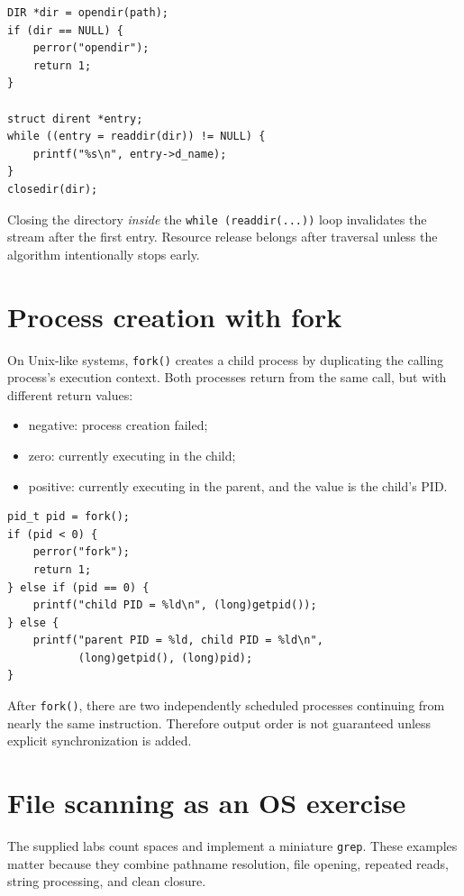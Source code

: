 \begin{lstlisting}[style=osc]
DIR *dir = opendir(path);
if (dir == NULL) {
    perror("opendir");
    return 1;
}

struct dirent *entry;
while ((entry = readdir(dir)) != NULL) {
    printf("%s\n", entry->d_name);
}
closedir(dir);
\end{lstlisting}

\begin{pitfall}
Closing the directory \emph{inside} the \texttt{while (readdir(...))} loop invalidates the stream after the first entry. Resource release belongs after traversal unless the algorithm intentionally stops early.
\end{pitfall}

\section{Process creation with fork}
On Unix-like systems, \texttt{fork()} creates a child process by duplicating the calling process's execution context. Both processes return from the same call, but with different return values:
\begin{itemize}
  \item negative: process creation failed;
  \item zero: currently executing in the child;
  \item positive: currently executing in the parent, and the value is the child's PID.
\end{itemize}

\begin{lstlisting}[style=osc]
pid_t pid = fork();
if (pid < 0) {
    perror("fork");
    return 1;
} else if (pid == 0) {
    printf("child PID = %ld\n", (long)getpid());
} else {
    printf("parent PID = %ld, child PID = %ld\n",
           (long)getpid(), (long)pid);
}
\end{lstlisting}

\begin{intuition}
After \texttt{fork()}, there are two independently scheduled processes continuing from nearly the same instruction. Therefore output order is not guaranteed unless explicit synchronization is added.
\end{intuition}

\section{File scanning as an OS exercise}
The supplied labs count spaces and implement a miniature \texttt{grep}. These examples matter because they combine pathname resolution, file opening, repeated reads, string processing, and clean closure.

